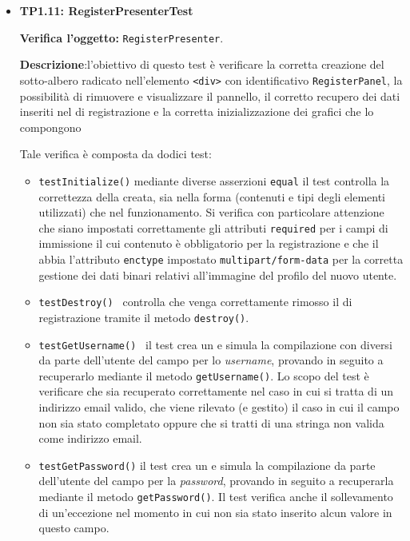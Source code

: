 \begin{itemize}
\item[\passed] \textbf{TP1.11: RegisterPresenterTest}

\textbf{Verifica l'oggetto:} \texttt{RegisterPresenter}.

\textbf{Descrizione}:l'obiettivo di questo test è verificare la corretta creazione del sotto-albero radicato nell'elemento \verb'<div>' con identificativo \texttt{RegisterPanel}, la possibilità di rimuovere e visualizzare il pannello, il corretto recupero dei dati inseriti nel  di registrazione e la corretta inizializzazione dei  grafici che lo compongono

Tale verifica è composta da dodici test:
\begin{itemize}

\item \texttt{testInitialize()} mediante diverse asserzioni \texttt{equal} il test controlla la correttezza della  creata, sia nella forma (contenuti e tipi degli elementi utilizzati) che nel funzionamento. Si verifica con particolare attenzione che siano impostati correttamente gli attributi \verb'required' per i campi di immissione il cui contenuto è obbligatorio per la registrazione e che il  abbia l'attributo \verb'enctype' impostato \verb'multipart/form-data' per la corretta gestione dei dati binari relativi all'immagine del profilo del nuovo utente.

\item \texttt{testDestroy() } controlla che venga correttamente rimosso il  di registrazione tramite il metodo \verb'destroy()'.

\item \texttt{testGetUsername() } il test crea un  e simula la compilazione con diversi  da parte dell'utente del campo per lo \textit{username}, provando in seguito a recuperarlo mediante il metodo \texttt{getUsername()}. Lo scopo del test è verificare che sia recuperato correttamente nel caso in cui si tratta di un indirizzo email valido, che viene rilevato (e gestito) il caso in cui il campo non sia stato completato oppure che si tratti di una stringa non valida come indirizzo email.

\item \texttt{testGetPassword()} il test crea un  e simula la compilazione da parte dell'utente del campo per la \textit{password}, provando in seguito a recuperarla mediante il metodo \texttt{getPassword()}. Il test verifica anche il sollevamento di un'eccezione nel momento in cui non sia stato inserito alcun valore in questo campo.


\end{itemize}
\end{itemize}
